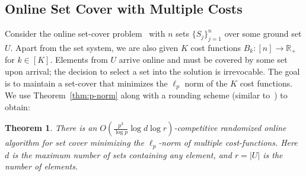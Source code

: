 \documentclass[letterpaper,11pt]{article}
\newtheorem{thm}{Theorem}[section]
\begin{document}
\subsection{Online Set Cover with Multiple Costs}
\label{sec:set-cover}

Consider the online set-cover problem~\cite{AAABN03} with $n$ sets
$\{S_j\}_{j=1}^n$ over some ground set $U$. Apart from the set system, we
are also given $K$ cost functions $B_k:[n]\rightarrow \mathbb{R}_+$ for
$k\in [K]$. Elements from $U$ arrive online and must be covered by some
set upon arrival; the decision to select a set into the solution is
irrevocable. The goal is to maintain a set-cover that minimizes the
$\ell_p$ norm of the $K$ cost functions. We use Theorem~\ref{thm:p-norm}
along with a rounding scheme (similar to~\cite{GKP11-waoa}) to obtain:
\begin{thm}
  \label{thm:p-norm:int}
  There is an $O\left(\frac{p^3}{\log p} \log d \log
    r\right)$-competitive randomized online algorithm for set cover
  minimizing the $\ell_p$-norm of multiple cost-functions. Here $d$ is
  the maximum number of sets containing any element, and $r=|U|$ is the
  number of elements.
\end{thm}
\end{document}
